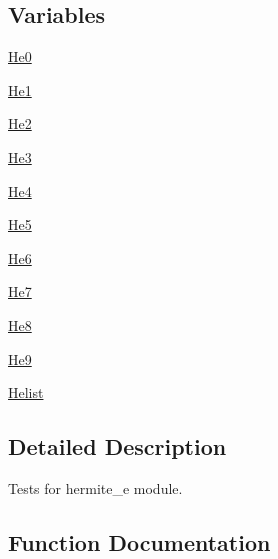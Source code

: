 \subsection*{Variables}
\begin{DoxyCompactItemize}
\item 
\hyperlink{namespacenumpy_1_1polynomial_1_1tests_1_1test__hermite__e_acdd9eff64555e8598bf524ec5a4ecedb}{He0}
\item 
\hyperlink{namespacenumpy_1_1polynomial_1_1tests_1_1test__hermite__e_aa9b0e95e079f3b0f0d2a77e89458b326}{He1}
\item 
\hyperlink{namespacenumpy_1_1polynomial_1_1tests_1_1test__hermite__e_a71578807292fe1ce914221b708be622e}{He2}
\item 
\hyperlink{namespacenumpy_1_1polynomial_1_1tests_1_1test__hermite__e_a9ef492dd8b357b84a910f440c6e4ba1b}{He3}
\item 
\hyperlink{namespacenumpy_1_1polynomial_1_1tests_1_1test__hermite__e_ab1d41efcefc7bc963322d60fd75494fc}{He4}
\item 
\hyperlink{namespacenumpy_1_1polynomial_1_1tests_1_1test__hermite__e_a32995a97c586384a127333930195596e}{He5}
\item 
\hyperlink{namespacenumpy_1_1polynomial_1_1tests_1_1test__hermite__e_a456dd49a13673ac0c5ea46adffd171c4}{He6}
\item 
\hyperlink{namespacenumpy_1_1polynomial_1_1tests_1_1test__hermite__e_a44c9e4bc16624664f4036c789a9d1d67}{He7}
\item 
\hyperlink{namespacenumpy_1_1polynomial_1_1tests_1_1test__hermite__e_a93064c58a46397463174ecab0b149487}{He8}
\item 
\hyperlink{namespacenumpy_1_1polynomial_1_1tests_1_1test__hermite__e_a736dafb8be12befeeaf8859de55ef8ef}{He9}
\item 
\hyperlink{namespacenumpy_1_1polynomial_1_1tests_1_1test__hermite__e_a603f101b5f40e0862700225896ac0839}{Helist}
\end{DoxyCompactItemize}


\subsection{Detailed Description}
\begin{DoxyVerb}Tests for hermite_e module.\end{DoxyVerb}
 

\subsection{Function Documentation}
\mbox{\label{namespacenumpy_1_1polynomial_1_1tests_1_1test__hermite__e_a11abd08f0595283335acb253ec05ca19}} 
